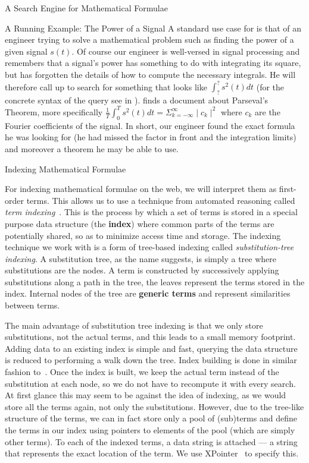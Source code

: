 \begin{omgroup}[id=mathwebsearch,creators={isucan,miko}]{A Search Engine for Mathematical Formulae}
\begin{omgroup}[id=mws.runnex]{A Running Example: The Power of a Signal}
A standard use case for {\mmlsearch} is that of an engineer trying to solve a mathematical
problem such as finding the power of a given signal $s(t)$.  Of course our engineer is
well-versed in signal processing and remembers that a signal's power has something to do
with integrating its square, but has forgotten the details of how to compute the necessary
integrals. He will therefore call up {\mmlsearch} to search for something that looks like
$\int_?^?s^2(t)dt$ (for the concrete syntax of the query see {}
in {}). {\mmlsearch} finds a document about Parseval's Theorem, more
specifically $\frac{1}{T}\int_0^Ts^2(t)dt = \Sigma_{k=-\infty}^{\infty}\mid c_k\mid^2$
where $c_k$ are the Fourier coefficients of the signal.  In short, our engineer found the
exact formula he was looking for (he had missed the factor in front and the integration
limits) and moreover a theorem he may be able to use.
\end{omgroup}

\begin{omgroup}{Indexing Mathematical Formulae}

For indexing mathematical formulae on the web, we will interpret them as first-order
terms. This allows us to use a technique from automated reasoning called {\emph{term
    indexing}}~\cite{Graf:ti96}. This is the process by which a set of terms is stored in
a special purpose data structure (the {\bf{index}}) where common parts of the terms are
potentially shared, so as to minimize access time and storage. The indexing technique we
work with is a form of tree-based indexing called {\emph{substitution-tree indexing}}. A
substitution tree, as the name suggests, is simply a tree where substitutions are the
nodes. A term is constructed by successively applying substitutions along a path in the
tree, the leaves represent the terms stored in the index. Internal nodes of the tree are
{\bf{generic terms}} and represent similarities between terms.

The main advantage of substitution tree indexing is that we only store substitutions, not
the actual terms, and this leads to a small memory footprint.  Adding data to an existing
index is simple and fast, querying the data structure is reduced to performing a walk down
the tree.  Index building is done in similar fashion to~\cite{Graf:ti96}. Once the index
is built, we keep the actual term instead of the substitution at each node, so we do not
have to recompute it with every search. At first glance this may seem to be against the
idea of indexing, as we would store all the terms again, not only the
substitutions. However, due to the tree-like structure of the terms, we can in fact store
only a pool of (sub)terms and define the terms in our index using pointers to elements of
the pool (which are simply other terms). To each of the indexed terms, a data string is
attached --- a string that represents the exact location of the term. We use
XPointer~\cite{GroMal:xf03} to specify this.


\end{omgroup}
\end{omgroup}
